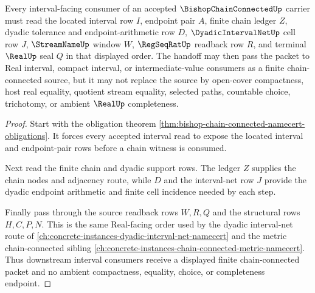 \begin{theorem}
\label{thm:bishop-chain-connected-interval-handoff}
Every interval-facing consumer of an accepted $\BishopChainConnectedUp$ carrier must read the located interval row $I$, endpoint pair $A$, finite chain ledger $Z$, dyadic tolerance and endpoint-arithmetic row $D$, $\DyadicIntervalNetUp$ cell row $J$, $\StreamNameUp$ window $W$, $\RegSeqRatUp$ readback row $R$, and terminal $\RealUp$ seal $Q$ in that displayed order. The handoff may then pass the packet to Real interval, compact interval, or intermediate-value consumers as a finite chain-connected source, but it may not replace the source by open-cover compactness, host real equality, quotient stream equality, selected paths, countable choice, trichotomy, or ambient $\RealUp$ completeness.
\end{theorem}
\begin{proof}
Start with the obligation theorem \autoref{thm:bishop-chain-connected-namecert-obligations}. It forces every accepted interval read to expose the located interval and endpoint-pair rows before a chain witness is consumed.

Next read the finite chain and dyadic support rows. The ledger $Z$ supplies the chain nodes and adjacency route, while $D$ and the interval-net row $J$ provide the dyadic endpoint arithmetic and finite cell incidence needed by each step.

Finally pass through the source readback rows $W,R,Q$ and the structural rows $H,C,P,N$. This is the same Real-facing order used by the dyadic interval-net route of \autoref{ch:concrete-instances-dyadic-interval-net-namecert} and the metric chain-connected sibling \autoref{ch:concrete-instances-chain-connected-metric-namecert}. Thus downstream interval consumers receive a displayed finite chain-connected packet and no ambient compactness, equality, choice, or completeness endpoint.
\end{proof}


